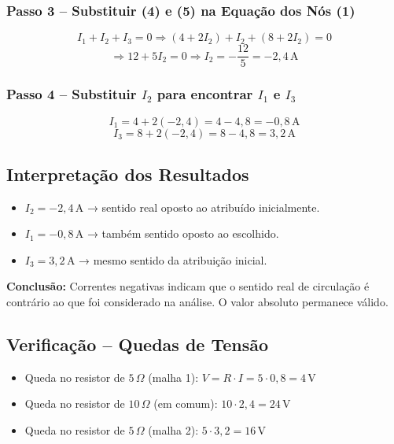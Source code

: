 \subsubsection{Passo 3 – Substituir (4) e (5) na Equação dos Nós (1)}

\[
I_1 + I_2 + I_3 = 0
\Rightarrow (4 + 2I_2) + I_2 + (8 + 2I_2) = 0
\]
\[
\Rightarrow 12 + 5I_2 = 0 \Rightarrow I_2 = -\frac{12}{5} = -2{,}4\,\text{A}
\]

\subsubsection{Passo 4 – Substituir $I_2$ para encontrar $I_1$ e $I_3$}

\[
I_1 = 4 + 2(-2{,}4) = 4 - 4{,}8 = -0{,}8\,\text{A}
\]
\[
I_3 = 8 + 2(-2{,}4) = 8 - 4{,}8 = 3{,}2\,\text{A}
\]

\subsection{Interpretação dos Resultados}

\begin{itemize}
    \item $I_2 = -2{,}4\,\text{A}$ → sentido real oposto ao atribuído inicialmente.
    \item $I_1 = -0{,}8\,\text{A}$ → também sentido oposto ao escolhido.
    \item $I_3 = 3{,}2\,\text{A}$ → mesmo sentido da atribuição inicial.
\end{itemize}

\textbf{Conclusão:} Correntes negativas indicam que o sentido real de circulação é contrário ao que foi considerado na análise. O valor absoluto permanece válido.

\subsection{Verificação – Quedas de Tensão}

\begin{itemize}
    \item Queda no resistor de $5\,\Omega$ (malha 1): $V = R \cdot I = 5 \cdot 0{,}8 = 4\,\text{V}$
    \item Queda no resistor de $10\,\Omega$ (em comum): $10 \cdot 2{,}4 = 24\,\text{V}$
    \item Queda no resistor de $5\,\Omega$ (malha 2): $5 \cdot 3{,}2 = 16\,\text{V}$
\end{itemize}


